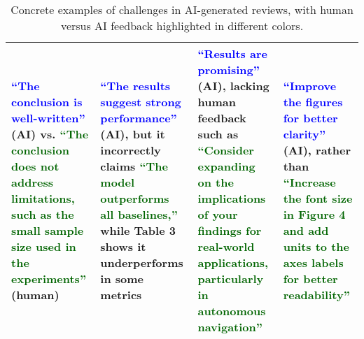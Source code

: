 \documentclass{article}
\begin{document}
\begin{table}[t]
\begin{tabular}{|p{4cm}|p{4cm}|p{4cm}|p{4cm}|}
\fontsize{12pt}{22pt}\selectfont 
\textcolor{blue}{``The conclusion is well-written''} (AI) vs. 
\textcolor{darkgreen}{``The conclusion does not address limitations, such as the small sample size used in the experiments''} (human)
&
\fontsize{12pt}{22pt}\selectfont 
\textcolor{blue}{``The results suggest strong performance''} (AI), but it incorrectly claims 
\textcolor{darkgreen}{``The model outperforms all baselines,''} while Table 3 shows it underperforms in some metrics
&
\fontsize{12pt}{22pt}\selectfont 
\textcolor{blue}{``Results are promising''} (AI), lacking human feedback such as 
\textcolor{darkgreen}{``Consider expanding on the implications of your findings for real-world applications, particularly in autonomous navigation''}
&
\fontsize{12pt}{22pt}\selectfont 
\textcolor{blue}{``Improve the figures for better clarity''} (AI), rather than 
\textcolor{darkgreen}{``Increase the font size in Figure 4 and add units to the axes labels for better readability''}
\\ \hline
\end{tabular}
\caption{Concrete examples of challenges in AI-generated reviews, with human versus AI feedback highlighted in different colors.}
\label{tab:review_challenges}
\end{table}
\end{document}
